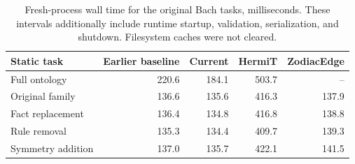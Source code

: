 \begin{table}[ht]
\caption{Fresh-process wall time for the original Bach tasks, milliseconds. These intervals additionally include runtime startup, validation, serialization, and shutdown. Filesystem caches were not cleared.}
\label{tab:bach-process}
\centering\small
\begin{tabular}{@{}lrrrr@{}}
\toprule
Static task & Earlier baseline & Current & HermiT & ZodiacEdge \\
\midrule
Full ontology & 220.6 & 184.1 & 503.7 & -- \\
Original family & 136.6 & 135.6 & 416.3 & 137.9 \\
Fact replacement & 136.4 & 134.8 & 416.8 & 138.8 \\
Rule removal & 135.3 & 134.4 & 409.7 & 139.3 \\
Symmetry addition & 137.0 & 135.7 & 422.1 & 141.5 \\
\bottomrule
\end{tabular}
\end{table}
